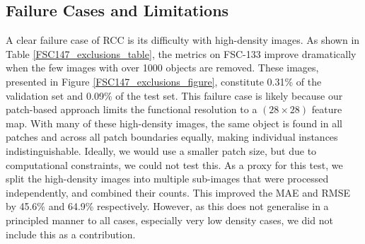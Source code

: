 \documentclass[letterpaper, 11pt]{IEEEtran}
\begin{document}
\subsection{Failure Cases and Limitations}
\label{failure_cases}
A clear failure case of RCC is its difficulty with high-density images.
As shown in Table \ref{FSC147_exclusions_table}, the metrics on FSC-133 improve dramatically when the few images with over 1000 objects are removed.
These images, presented in Figure \ref{FSC147_exclusions_figure}, constitute 0.31\% of the validation set and 0.09\% of the test set.
This failure case is likely because our patch-based approach limits the functional resolution to a $(28\times28)$ feature map.
With many of these high-density images, the same object is found in all patches and across all patch boundaries equally, making individual instances indistinguishable. 
Ideally, we would use a smaller patch size, but due to computational constraints, we could not test this.
As a proxy for this test, we split the high-density images into multiple sub-images that were processed independently, and combined their counts.
This improved the  MAE and RMSE by 45.6\% and 64.9\% respectively. 
However, as this does not generalise in a principled manner to all cases, especially very low density cases, we did not include this as a contribution.
\end{document}
